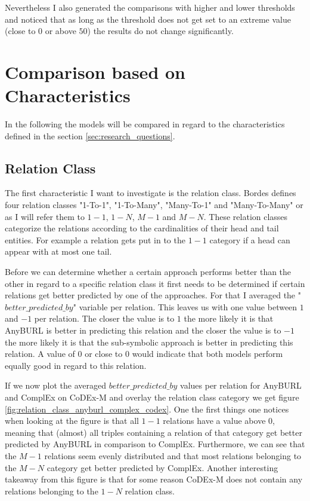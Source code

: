 Nevertheless I also generated the comparisons with higher and lower thresholds and noticed that as long as the threshold does not get set to an extreme value (close to $0$ or above $50$) the results do not change significantly.

\section{Comparison based on Characteristics}
In the following the models will be compared in regard to the characteristics defined in the section \ref{sec:research_questions}.

\subsection{Relation Class}
The first characteristic I want to investigate is the relation class. Bordes \cite{bordes_translating_2013} defines four relation classes "1-To-1", "1-To-Many", "Many-To-1" and "Many-To-Many" or as I will refer them to $1-1$, $1-N$, $M-1$ and $M-N$. These relation classes categorize the relations according to the cardinalities of their head and tail entities. For example a relation gets put in to the $1-1$ category if a head can appear with at most one tail. 

Before we can determine whether a certain approach performs better than the other in regard to a specific relation class it first needs to be determined if certain relations get better predicted by one of the approaches. For that I averaged the "$better\_predicted\_by$" variable per relation. This leaves us with one value between $1$ and $-1$ per relation. The closer the value is to $1$ the more likely it is that AnyBURL is better in predicting this relation and the closer the value is to $-1$ the more likely it is that the sub-symbolic approach is better in predicting this relation. A value of $0$ or close to $0$ would indicate that both models perform equally good in regard to this relation.

If we now plot the averaged $better\_predicted\_by$ values per relation for AnyBURL and ComplEx on CoDEx-M and overlay the relation class category we get figure \ref{fig:relation_class_anyburl_complex_codex}. One the first things one notices when looking at the figure is that all $1-1$ relations have a value above $0$, meaning that (almost) all triples containing a relation of that category get better predicted by AnyBURL in comparison to ComplEx. Furthermore, we can see that the $M-1$ relations seem evenly distributed and that most relations belonging to the $M-N$ category get better predicted by ComplEx. Another interesting takeaway from this figure is that for some reason CoDEx-M does not contain any relations belonging to the $1-N$ relation class. 

